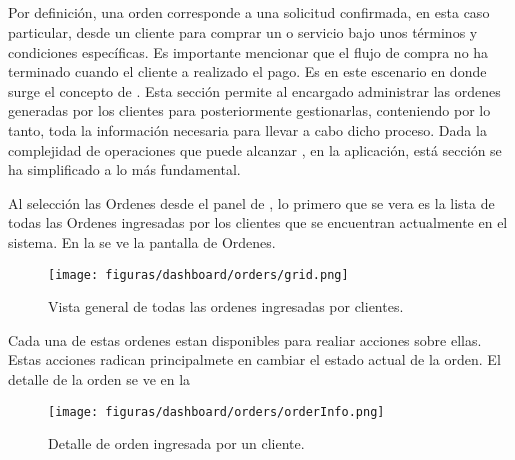 \subsection{\ordersEF}

	Por definición, una orden corresponde a una solicitud confirmada, en esta caso particular, desde un cliente para comprar un \itemCOM o servicio bajo unos términos y condiciones específicas. Es importante mencionar que el flujo de compra no ha terminado cuando el cliente a realizado el pago. Es en este escenario en donde surge el concepto de \orderFulfillmentCOM.
	Esta sección permite al encargado administrar las ordenes generadas por los clientes para posteriormente gestionarlas, conteniendo por lo tanto, toda la información necesaria para llevar a cabo dicho proceso.
	Dada la complejidad de operaciones que puede alcanzar \orderFulfillmentCOM, en la aplicación, está sección se ha simplificado a lo más fundamental.

	Al selección las Ordenes desde el panel de \dashboardEF, lo primero que se vera es la lista de todas las Ordenes ingresadas por los clientes que se encuentran actualmente en el sistema. En la  se ve la pantalla de Ordenes.


	\begin{figure}[H]
		\centering
		\texttt{[image: figuras/dashboard/orders/grid.png]}
		\caption{Vista general de todas las ordenes ingresadas por clientes.}
		\label{figure:dashboard:orders:grid}
	\end{figure}

	Cada una de estas ordenes estan disponibles para realiar acciones sobre ellas. Estas acciones radican principalmete en cambiar el estado actual de la orden. El detalle de la orden se ve en la 
	\begin{figure}[H]
		\centering
		\texttt{[image: figuras/dashboard/orders/orderInfo.png]}
		\caption{Detalle de orden ingresada por un cliente.}
		\label{figure:dashboard:orders:orderInfo}
	\end{figure}